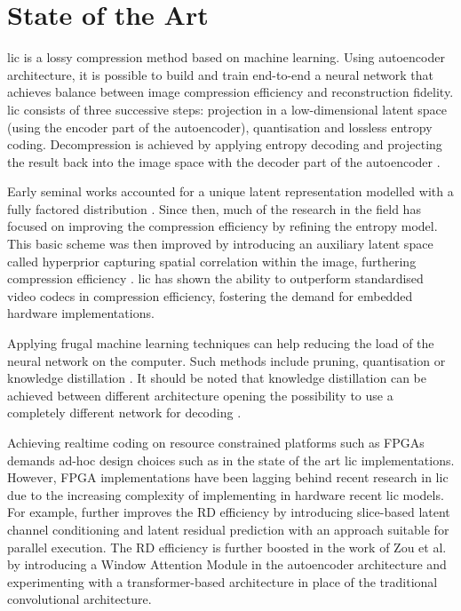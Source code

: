 \chapter{State of the Art}
\label{sota}
\acrfull{lic} is a lossy compression method based on machine learning. Using autoencoder architecture, it is possible to build and train end-to-end a neural network that achieves balance between image compression efficiency and reconstruction fidelity. \acrshort{lic} consists of three successive steps: projection in a low-dimensional latent space (using the encoder part of the autoencoder), quantisation and lossless entropy coding. Decompression is achieved by applying entropy decoding and projecting the result back into the image space with the decoder part of the autoencoder \cite{licmedium, licstanford}.

Early seminal works accounted for a unique latent representation modelled with a fully factored distribution \cite{ballé2017endtoendoptimizedimagecompression}. Since then, much of the research in the field has focused on improving the compression efficiency by refining the entropy model. This basic scheme was then improved by introducing an auxiliary latent space called hyperprior capturing spatial correlation within the image, furthering compression efficiency \cite{ballé2018variationalimagecompressionscale}. \acrshort{lic} has shown the ability to outperform standardised video codecs in compression efficiency, fostering the demand for embedded hardware implementations.

Applying frugal machine learning techniques can help reducing the load of the neural network on the computer. Such methods include pruning, quantisation or knowledge distillation \cite{touvron2021trainingdataefficientimagetransformers}. It should be noted that knowledge distillation can be achieved between different architecture opening the possibility to use a completely different network for decoding \cite{liu2022crossarchitectureknowledgedistillation}.

Achieving realtime coding on resource constrained platforms such as FPGAs demands ad-hoc design choices such as in the state of the art \acrshort{lic} implementations. However, FPGA implementations have been lagging behind recent research in \acrshort{lic} due to the increasing complexity of implementing in hardware recent \acrshort{lic} models. For example, further improves the RD efficiency by introducing slice-based latent channel conditioning and latent residual prediction with an approach suitable for parallel execution. The RD efficiency is further boosted in the work of Zou et al. \cite{zou2022devildetailswindowbasedattention} by introducing a Window Attention Module in the autoencoder architecture and experimenting with a transformer-based architecture in place of the traditional convolutional architecture.
